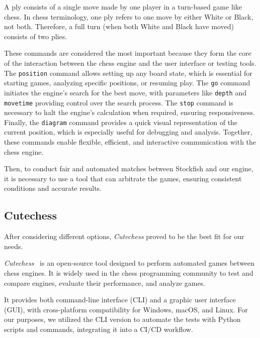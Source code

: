 \noindent A ply consists of a single move made by one player in a turn-based game like chess. In chess terminology, one ply refers to one move by either White or Black, not both. Therefore, a full turn (when both White and Black have moved) consists of two plies.

\vspace{1em}

\noindent These commands are considered the most important because they form the core of the interaction between the chess engine and the user interface or testing tools. The \texttt{position} command allows setting up any board state, which is essential for starting games, analyzing specific positions, or resuming play. The \texttt{go} command initiates the engine's search for the best move, with parameters like \texttt{depth} and \texttt{movetime} providing control over the search process. The \texttt{stop} command is necessary to halt the engine's calculation when required, ensuring responsiveness. Finally, the \texttt{diagram} command provides a quick visual representation of the current position, which is especially useful for debugging and analysis. Together, these commands enable flexible, efficient, and interactive communication with the chess engine.

\vspace{1em}

\noindent Then, to conduct fair and automated matches between Stockfish and our engine, it is necessary to use a tool that can arbitrate the games, ensuring consistent conditions and accurate results.

\subsection{Cutechess}

\noindent After considering different options, \textit{Cutechess} proved to be the best fit for our needs.

\vspace{1em}

\noindent \textit{Cutechess}~\cite{CuteChess} is an open-source tool designed to perform automated games between chess engines. It is widely used in the chess programming community to test and compare engines, evaluate their performance, and analyze games.

\vspace{1em}

\noindent It provides both command-line interface (CLI) and a graphic user interface (GUI), with cross-platform compatibility for Windows, macOS, and Linux. For our purposes, we utilized the CLI version to automate the tests with Python scripts and commands, integrating it into a CI/CD workflow.

